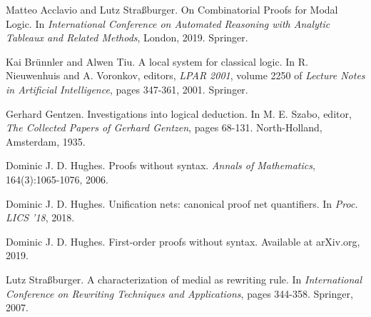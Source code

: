 \vspace{-0.3em}

\begin{thebibliography}{99}

  Matteo Acclavio and Lutz Straßburger. On Combinatorial Proofs for Modal Logic. In \textit{International Conference on Automated Reasoning with Analytic Tableaux and Related Methods}, London, 2019. Springer.

  Kai Brünnler and Alwen Tiu. A local system for classical logic. In R. Nieuwenhuis and A. Voronkov, editors, \textit{LPAR 2001}, volume 2250 of \textit{Lecture Notes in Artificial Intelligence}, pages 347-361, 2001. Springer.

  Gerhard Gentzen. Investigations into logical deduction. In M. E. Szabo, editor, \textit{The Collected Papers of Gerhard Gentzen}, pages 68-131. North-Holland, Amsterdam, 1935.

  Dominic J. D. Hughes. Proofs without syntax. \textit{Annals of Mathematics}, 164(3):1065-1076, 2006.

  Dominic J. D. Hughes.  Unification nets: canonical proof net quantifiers. In \textit{Proc. LICS '18}, 2018.

  Dominic J. D. Hughes. First-order proofs without syntax. Available at arXiv.org, 2019.

	Lutz Straßburger. A characterization of medial as rewriting rule. In
		\textit{International Conference on Rewriting Techniques and
		Applications}, pages 344-358. Springer, 2007.

\end{thebibliography}
